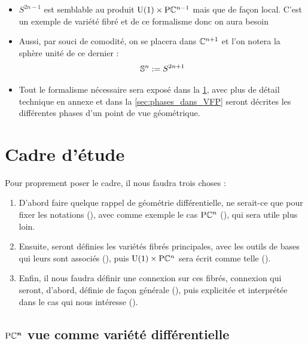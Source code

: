 

\begin{itemize}
	
	\item $S^{2n-1}$ est semblable au produit $\text{\normalfont U}(1)\times \text{\normalfont P}\mathbb{C}^{n-1}$ mais que de façon local. C'est un exemple de variété fibré et de ce formalisme donc on aura besoin
	
	\item Aussi, par souci de comodité, on se placera dans $\mathbb{C}^{n+1}$ et l'on notera la sphère unité de ce dernier :
	\[\mathbb{ S}^{n} := S^{2n+1}\]
	
	\item Tout le formalisme nécessaire sera exposé dans la \cref{sec:cadre_geodiff}, avec plus de détail technique en annexe et dans la \cref{sec:phases_dans_VFP} seront décrites les différentes phases d'un point de vue géométrique.
	
\end{itemize}



\section{Cadre d'étude}\label{sec:cadre_geodiff}

Pour proprement poser le cadre, il nous faudra trois choses :
\begin{enumerate}
	
	\item D'abord faire quelque rappel de géométrie différentielle, ne serait-ce que pour fixer les notations (), avec comme exemple le cas $\text{\normalfont P}\mathbb{C}^{n}$ (), qui sera utile plus loin. 
	
	\item Ensuite, seront définies les variétés fibrés principales, avec les outils de bases qui leurs sont associés (), puis $\text{\normalfont U}(1)\times \text{\normalfont P}\mathbb{C}^{n}$ sera écrit comme telle ().
	
	\item Enfin, il nous faudra définir une connexion sur ces fibrés, connexion qui seront, d'abord, définie de façon générale (), puis explicitée et interprétée dans le cas qui nous intéresse ().
	
\end{enumerate}



\subsection{$\boldsymbol{\text{\normalfont P}\mathbb{C}^{n}}$ vue comme variété différentielle} \label{subsec:construc_PC^n}

